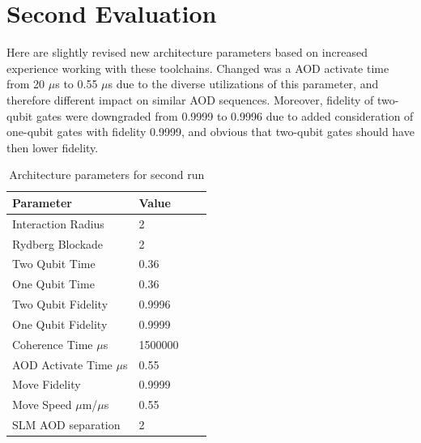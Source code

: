 \section{Second Evaluation}
Here are slightly revised new architecture parameters based on increased experience working with these toolchains.
Changed was a \ac{AOD} activate time from 20 $\mu$s to 0.55 $\mu$s due to the diverse utilizations of this parameter,
and therefore different impact on similar \ac{AOD} sequences.
Moreover, fidelity of two-qubit gates were downgraded from 0.9999 to 0.9996 
due to added consideration of one-qubit gates with fidelity 0.9999,
and obvious that two-qubit gates should have then lower fidelity.
\begin{table}[htpb]
  \caption[Architecture Second Run]{Architecture parameters for second run}\label{tab:architecture_second}
  \centering
  \begin{tabular}{l l l l}
    \toprule
      Parameter & Value \\
    \midrule
      Interaction Radius & 2 \\
      Rydberg Blockade & 2 \\
      Two Qubit Time & 0.36 \\
      One Qubit Time & 0.36 \\
      Two Qubit Fidelity & 0.9996 \\
      One Qubit Fidelity & 0.9999 \\
      Coherence Time $\mu$s & 1500000 \\
      AOD Activate Time $\mu$s & 0.55 \\
      Move Fidelity  & 0.9999 \\
      Move Speed $\mu$m/$\mu$s & 0.55 \\
      SLM AOD separation & 2\\
    \bottomrule
  \end{tabular}
\end{table}

